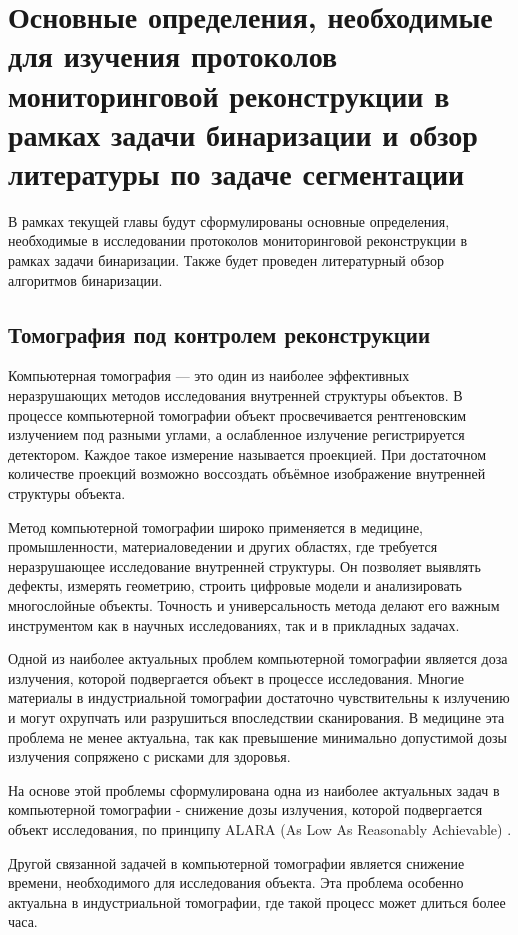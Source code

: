 \section{Основные определения, необходимые для изучения протоколов мониторинговой реконструкции в рамках задачи бинаризации и обзор литературы по задаче сегментации}

В рамках текущей главы будут сформулированы основные определения, необходимые в исследовании протоколов мониторинговой реконструкции в рамках задачи бинаризации. Также будет проведен литературный обзор алгоритмов бинаризации.

\subsection{Томография под контролем реконструкции}

Компьютерная томография — это один из наиболее эффективных неразрушающих методов исследования внутренней структуры объектов.  В процессе компьютерной томографии объект просвечивается рентгеновским излучением под разными углами, а ослабленное излучение регистрируется детектором. Каждое такое измерение называется проекцией. При достаточном количестве проекций возможно воссоздать объёмное изображение внутренней структуры объекта.

Метод компьютерной томографии широко применяется в медицине, промышленности, материаловедении и других областях, где требуется неразрушающее исследование внутренней структуры. Он позволяет выявлять дефекты, измерять геометрию, строить цифровые модели и анализировать многослойные объекты. Точность и универсальность метода делают его важным инструментом как в научных исследованиях, так и в прикладных задачах.

Одной из наиболее актуальных проблем компьютерной томографии является доза излучения, которой подвергается объект в процессе исследования. Многие материалы в индустриальной томографии достаточно чувствительны к излучению и могут охрупчать или разрушиться впоследствии сканирования. В медицине эта проблема не менее актуальна, так как превышение минимально допустимой дозы излучения сопряжено с рисками для здоровья.

На основе этой проблемы сформулирована одна из наиболее актуальных задач в компьютерной томографии - снижение дозы излучения, которой подвергается объект исследования, по принципу ALARA (As Low As Reasonably Achievable) \cite{slovis2002alara}.

Другой связанной задачей в компьютерной томографии является снижение времени, необходимого для исследования объекта. Эта проблема особенно актуальна в индустриальной томографии, где такой процесс может длиться более часа.

